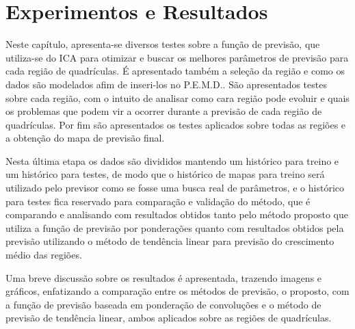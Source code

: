 \chapter{Experimentos e Resultados}
\label{experimentos}
Neste capítulo, apresenta-se diversos testes sobre a função de previsão, que utiliza-se do ICA para otimizar e buscar os melhores parâmetros de previsão para cada região de quadrículas. É apresentado também a seleção da região e como os dados são modelados afim de inseri-los no P.E.M.D.. São apresentados testes sobre cada região, com o intuito de analisar como cara região pode evoluir e quais os problemas que podem vir a ocorrer durante a previsão de cada região de quadrículas. Por fim são apresentados os testes aplicados sobre todas as regiões e a obtenção do mapa de previsão final. 

Nesta última etapa os dados são divididos mantendo um histórico para treino e um histórico para testes, de modo que o histórico de mapas para treino será utilizado pelo previsor como se fosse uma busca real de parâmetros, e o histórico para testes fica reservado para comparação e validação do método, que é comparando e analisando com resultados obtidos tanto pelo método proposto que utiliza a função de previsão por ponderações quanto com resultados obtidos pela previsão utilizando o método de tendência linear para previsão do crescimento médio das regiões.

Uma breve discussão sobre os resultados é apresentada, trazendo imagens e gráficos, enfatizando a comparação entre os métodos de previsão, o proposto, com a função de previsão baseada em ponderação de convoluções e o método de previsão de tendência linear, ambos aplicados sobre as regiões de quadrículas.



